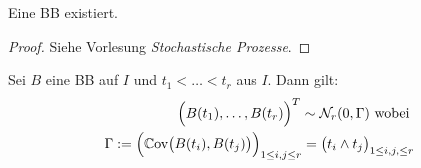 
\begin{satz}[Lévy]\label{satz7.13Levy}
	Eine BB existiert.
\end{satz}

\begin{proof}
	Siehe Vorlesung \textit{Stochastische Prozesse}.
\end{proof}

\begin{lemma}\label{lemma7.14}
	Sei $B$ eine BB auf $I$ und $t_1<\ldots<t_r$ aus $I$. Dann gilt:
	\begin{align*}
		\Big(B(t_1),\ldots, B(t_r)\Big)^T\sim\mathcal{N}_r(0,\Gamma)\text{ wobei }\\
		\Gamma:=\Big(\mathbb{C}\text{ov}\big(B(t_i),B(t_j)\big)\Big)_{1\leq i,j\leq r}=\big(t_i\wedge t_j\big)_{1\leq i,j,\leq r}
	\end{align*}
\end{lemma}

